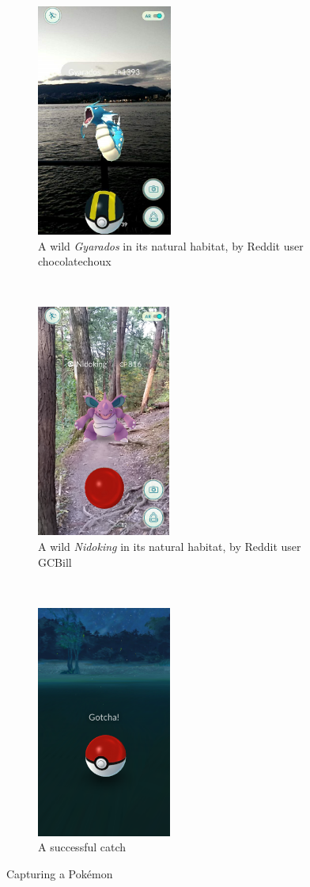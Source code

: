 \begin{figure}[h]
	\centering
	\begin{subfigure}[t]{0.3\textwidth}
		\centering
		\includegraphics[height=3in]{Figures/pogo-gyarados-chocolatechoux}
		\caption{A wild \emph{Gyarados} in its natural habitat, by Reddit user chocolatechoux}
	\end{subfigure}
	~
	\begin{subfigure}[t]{0.3\textwidth}
		\centering
		\includegraphics[height=3in]{Figures/pogo-nidoking-blocking-trail-GCBill}
		\caption{A wild \emph{Nidoking} in its natural habitat, by Reddit user GCBill}
	\end{subfigure}
	~
	\begin{subfigure}[t]{0.3\textwidth}
		\centering
		\includegraphics[height=3in]{Figures/pogo-catch-gotcha}
		\caption{A successful catch}
	\end{subfigure}
	\caption{Capturing a Pokémon}
\end{figure}

